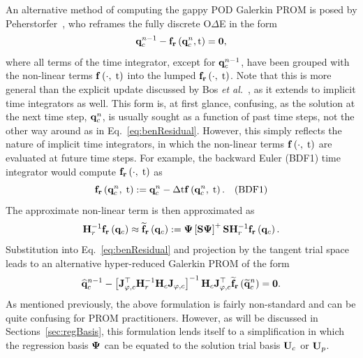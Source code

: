 An alternative method of computing the gappy POD Galerkin PROM is posed by Peherstorfer~\cite{Peherstorfer2020Adaptive}, who reframes the fully discrete O$\Delta$E in the form
%
\begin{equation}\label{eq:benResidual}
	\mathbf{q}_{c}^{n-1} - \mathbf{f}_{\mathbf{r}}\left(\mathbf{q}_{c}^{n}, \text{t}\right) = \mathbf{0},
\end{equation}
%
where all terms of the time integrator, except for $\mathbf{q}_{c}^{n - 1}$, have been grouped with the non-linear terms $\mathbf{f} \left(\cdot, \; \text{t}\right)$ into the lumped $\mathbf{f}_{\mathbf{r}}\left(\cdot, \; \text{t}\right)$. Note that this is more general than the explicit update discussed by Bos \textit{et al.}~\cite{Bos2004}, as it extends to implicit time integrators as well. This form is, at first glance, confusing, as the solution at the next time step, $\mathbf{q}_{c}^{n}$, is usually sought as a function of past time steps, not the other way around as in Eq.~\ref{eq:benResidual}. However, this simply reflects the nature of implicit time integrators, in which the non-linear terms $\mathbf{f} \left(\cdot, \; \text{t}\right)$ are evaluated at future time steps. For example, the backward Euler (BDF1) time integrator would compute $\mathbf{f}_{\mathbf{r}}\left(\cdot, \; \text{t}\right)$ as
%
\begin{equation}
	\mathbf{f}_{\mathbf{r}}\left(\mathbf{q}_{c}^{n}, \; \text{t}\right) := \mathbf{q}_{c}^{n} - \Delta \text{t} \mathbf{f} \left(\mathbf{q}_{c}^{n}, \; \text{t}\right). \quad \text{(BDF1)}
\end{equation}
%
The approximate non-linear term is then approximated as
%
\begin{equation}
	\resScaleInv \rhsResFunc{\consVec} \approx \rhsResApproxFunc{\consVec} \defEq \deimBasis \left[\sampMat \deimBasis \right]^+ \sampMat \resScaleInv \rhsResFunc{\consVec}.
\end{equation}
%
Substitution into Eq.~\ref{eq:benResidual} and projection by the tangent trial space leads to an alternative hyper-reduced Galerkin PROM of the form
%
\begin{equation}
    \consVecCoef^{\timeIdx-1} - \left[\jacobTrialCons^\top \resScaleInv \jacobDecodeCons\right]^{-1} \jacobDecodeCons^\top \rhsResApproxFunc{\consVecRom^{\timeIdx}} = \zeroVec.
\end{equation}
%
As mentioned previously, the above formulation is fairly non-standard and can be quite confusing for PROM practitioners. However, as will be discussed in Sections~\ref{sec:regBasis}, this formulation lends itself to a simplification in which the regression basis $\deimBasis$ can be equated to the solution trial basis $\consTrial$ or $\primTrial$.

